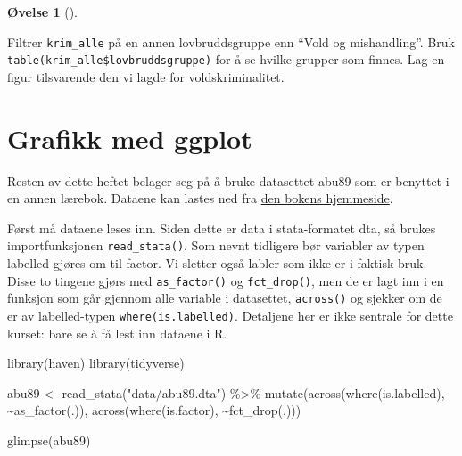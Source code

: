 \documentclass[
  norsk,
  letterpaper,
  DIV=11,
  numbers=noendperiod]{scrreprt}
\newenvironment{Shaded}{\begin{snugshade}}{\end{snugshade}}
\newcommand{\FunctionTok}[1]{\textcolor[rgb]{0.28,0.35,0.67}{#1}}
\newcommand{\NormalTok}[1]{\textcolor[rgb]{0.00,0.23,0.31}{#1}}
\newcommand{\OtherTok}[1]{\textcolor[rgb]{0.00,0.23,0.31}{#1}}
\newcommand{\SpecialCharTok}[1]{\textcolor[rgb]{0.37,0.37,0.37}{#1}}
\newcommand{\StringTok}[1]{\textcolor[rgb]{0.13,0.47,0.30}{#1}}
\theoremstyle{definition}
\newtheorem{exercise}{Øvelse}[chapter]
\theoremstyle{remark}
\begin{document}
\begin{exercise}[]\protect\hypertarget{exr-forste2}{}\label{exr-forste2}

Filtrer \texttt{krim\_alle} på en annen lovbruddsgruppe enn ``Vold og
mishandling''. Bruk \texttt{table(krim\_alle\$lovbruddsgruppe)} for å se
hvilke grupper som finnes. Lag en figur tilsvarende den vi lagde for
voldskriminalitet.

\end{exercise}

\chapter{Grafikk med ggplot}\label{grafikk-med-ggplot}

Resten av dette heftet belager seg på å bruke datasettet abu89 som er
benyttet i en annen lærebok. Dataene kan lastes ned fra
\href{https://stata.fagbokforlaget.no/}{den bokens hjemmeside}.

Først må dataene leses inn. Siden dette er data i stata-formatet dta, så
brukes importfunksjonen \texttt{read\_stata()}. Som nevnt tidligere bør
variabler av typen labelled gjøres om til factor. Vi sletter også labler
som ikke er i faktisk bruk. Disse to tingene gjørs med
\texttt{as\_factor()} og \texttt{fct\_drop()}, men de er lagt inn i en
funksjon som går gjennom alle variable i datasettet, \texttt{across()}
og sjekker om de er av labelled-typen \texttt{where(is.labelled)}.
Detaljene her er ikke sentrale for dette kurset: bare se å få lest inn
dataene i R.

\begin{Shaded}
\begin{Highlighting}[]
\FunctionTok{library}\NormalTok{(haven)}
\FunctionTok{library}\NormalTok{(tidyverse)}

\NormalTok{abu89 }\OtherTok{\textless{}{-}} \FunctionTok{read\_stata}\NormalTok{(}\StringTok{"data/abu89.dta"}\NormalTok{) }\SpecialCharTok{\%\textgreater{}\%} 
  \FunctionTok{mutate}\NormalTok{(}\FunctionTok{across}\NormalTok{(}\FunctionTok{where}\NormalTok{(is.labelled), }\SpecialCharTok{\textasciitilde{}}\FunctionTok{as\_factor}\NormalTok{(.)),}
         \FunctionTok{across}\NormalTok{(}\FunctionTok{where}\NormalTok{(is.factor), }\SpecialCharTok{\textasciitilde{}}\FunctionTok{fct\_drop}\NormalTok{(.)))}

\FunctionTok{glimpse}\NormalTok{(abu89)}
\end{Highlighting}
\end{Shaded}
\end{document}
